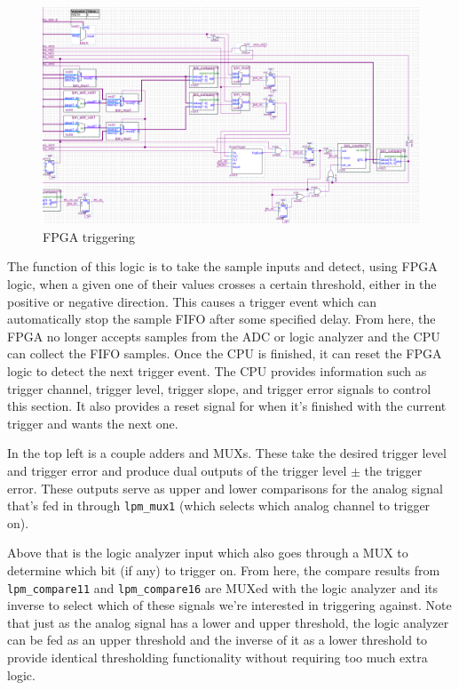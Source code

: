 \begin{figure}[ht!]
    \centering
    \includegraphics[width=6in]{fpga_logic/adc_trig.png}
		\caption{FPGA triggering}
\end{figure}

The function of this logic is to take the sample inputs and detect, using FPGA logic, when a given one of their values crosses a certain threshold, either in the positive or negative direction. This causes a trigger event which can automatically stop the sample FIFO after some specified delay. From here, the FPGA no longer accepts samples from the ADC or logic analyzer and the CPU can collect the FIFO samples. Once the CPU is finished, it can reset the FPGA logic to detect the next trigger event. The CPU provides information such as trigger channel, trigger level, trigger slope, and trigger error signals to control this section. It also provides a reset signal for when it's finished with the current trigger and wants the next one.

In the top left is a couple adders and MUXs. These take the desired trigger level and trigger error and produce dual outputs of the trigger level $\pm$ the trigger error. These outputs serve as upper and lower comparisons for the analog signal that's fed in through \verb=lpm_mux1= (which selects which analog channel to trigger on).

Above that is the logic analyzer input which also goes through a MUX to determine which bit (if any) to trigger on. From here, the compare results from \verb=lpm_compare11= and \verb=lpm_compare16= are MUXed with the logic analyzer and its inverse to select which of these signals we're interested in triggering against. Note that just as the analog signal has a lower and upper threshold, the logic analyzer can be fed as an upper threshold and the inverse of it as a lower threshold to provide identical thresholding functionality without requiring too much extra logic.

